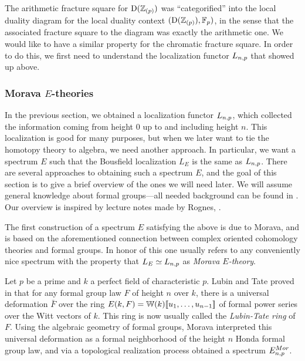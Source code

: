 \begin{remark}
    \label{ch0:rm:chromatic-square-from-duality}
    The arithmetic fracture square for $\mathrm{D}(\mathbb{Z}_{(p)})$ was ``categorified'' into the local duality diagram for the local duality context $(\mathrm{D}(\mathbb{Z}_{(p)}), \mathbb{F}_p)$, in the sense that the associated fracture square to the diagram was exactly the arithmetic one. We would like to have a similar property for the chromatic fracture square. In order to do this, we first need to understand the localization functor $L_{n,p}$ that showed up above. 
\end{remark}  






\subsubsection{Morava \texorpdfstring{$E$}{E}-theories}
\label{ch0:sssec:morava-E-theories}

In the previous section, we obtained a localization functor $L_{n,p}$, which collected the information coming from height $0$ up to and including height $n$. This localization is good for many purposes, but when we later want to tie the homotopy theory to algebra, we need another approach. In particular, we want a spectrum $E$ such that the Bousfield localization $L_E$ is the same as $L_{n,p}$. There are several approaches to obtaining such a spectrum $E$, and the goal of this section is to give a brief overview of the ones we will need later. We will assume general knowledge about formal groups---all needed background can be found in \cite[Appendix 2]{ravenel_86}. Our overview is inspired by lecture notes made by Rognes, \cite{rognes_2023}. 

The first construction of a spectrum $E$ satisfying the above is due to Morava, and is based on the aforementioned connection between complex oriented cohomology theories and formal groups. In honor of this one usually refers to any conveniently nice spectrum with the property that $L_E \simeq L_{n,p}$ as \emph{Morava $E$-theory}.

\begin{construction}
    Let $p$ be a prime and $k$ a perfect field of characteristic $p$. Lubin and Tate proved in \cite{lubin-tate_66} that for any formal group law $F$ of height $n$ over $k$, there is a universal deformation $\bar{F}$ over the ring $E(k, F)=\mathbb{W}(k)[\![ u_1, \ldots, u_{n-1}]\!]$ of formal power series over the Witt vectors of $k$. This ring is now usually called the \emph{Lubin-Tate ring} of $F$. Using the algebraic geometry of formal groups, Morava interpreted this universal deformation as a formal neighborhood of the height $n$ Honda formal group law, and via a topological realization process obtained a spectrum $E^{Mor}_{n,p}$.
\end{construction}

